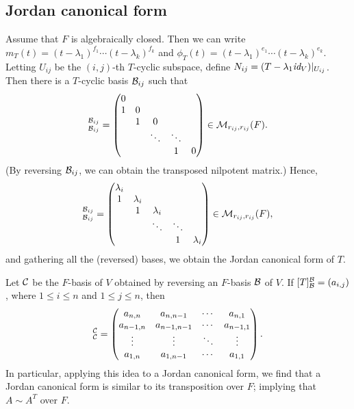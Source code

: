 \subsection{Jordan canonical form}
Assume that $F$ is algebraically closed.
Then we can write $m_T(t)=(t-\lambda_1)^{f_1}\cdots(t-\lambda_k)^{f_k}$ and $\phi_T(t)=(t-\lambda_1)^{e_1}\cdots(t-\lambda_k)^{e_k}$.
Letting $U_{i j}$ be the $(i, j)$-th $T$-cyclic subspace, define $N_{i j}=(T-\lambda_1\textit{id}_{V})|_{U_{i j}}$.
Then there is a $T$-cyclic basis ${\mathcal{B}}_{i j}$ such that
\begin{align*}
    [N_{i j}]^{\mc{B}_{i j}}_{\mc{B}_{i j}}=\begin{pmatrix}
        0   &       &       &       &   \\
        1   &   0   &       &       &   \\
            &   1   &   0   &       &   \\
            &       &\ddots &\ddots &   \\
            &       &       &   1   &   0
    \end{pmatrix}\in\mc{M}_{r_{i j}, r_{i j}}(F).
\end{align*}
(By reversing ${\mathcal{B}}_{i j}$, we can obtain the transposed nilpotent matrix.)
Hence,
\begin{align*}
    [T_{U|_{i j}}]^{\mc{B}_{i j}}_{\mc{B}_{i j}}=\begin{pmatrix}
        \lambda_i   &           &           &       &   \\
            1       &\lambda_i  &           &       &   \\
                    &     1     &\lambda_i  &       &   \\
                    &           &\ddots     &\ddots &   \\
                    &           &           &   1   &\lambda_i
    \end{pmatrix}\in\mc{M}_{r_{i j}, r_{i j}}(F),
\end{align*}
and gathering all the (reversed) bases, we obtain the Jordan canonical form of $T$.

\begin{obs}
    Let ${\mathcal{C}}$ be the $F$-basis of $V$ obtained by reversing an $F$-basis ${\mathcal{B}}$ of $V$.
    If $[T]^{\mathcal{B}}_{\mathcal{B}}=(a_{i, j})$, where $1\leq i\leq n$ and $1\leq j\leq n$, then
    \begin{align*}
        [T]^\mc{C}_\mc{C}=\begin{pmatrix}
            a_{n, n}    &   a_{n, n-1}      &   \cdots  &   a_{n, 1}    \\
            a_{n-1, n}  &   a_{n-1, n-1}    &   \cdots  &   a_{n-1, 1}  \\
            \vdots      &   \vdots          &   \ddots  &   \vdots      \\
            a_{1, n}    &   a_{1, n-1}      &   \cdots  &   a_{1, 1}
        \end{pmatrix}.
    \end{align*}
    In particular, applying this idea to a Jordan canonical form, we find that a Jordan canonical form is similar to its transposition over $F$; implying that $A\sim A^T$ over $F$.
\end{obs}


